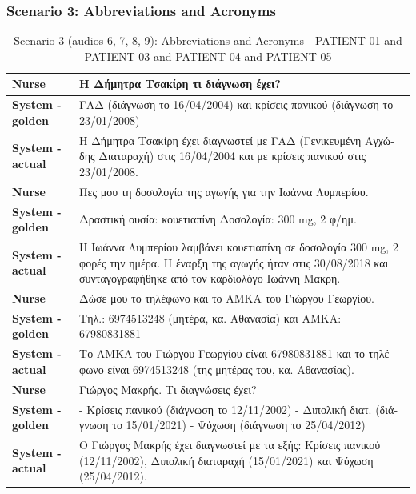 \subsubsection{Scenario 3: Abbreviations and Acronyms}
\begin{table}[H]
\centering
\renewcommand{\arraystretch}{1.5} 
\begin{tabular}{|>{\bfseries}l|p{11cm}|}
\hline
Nurse & \textgreek{Η Δήμητρα Τσακίρη τι διάγνωση έχει?} \\
\hline
System - golden & \textgreek{ΓΑΔ (διάγνωση το 16/04/2004) και κρίσεις πανικού (διάγνωση το 23/01/2008)} \\
\hline 
System - actual & \textgreek{Η Δήμητρα Τσακίρη έχει διαγνωστεί με ΓΑΔ (Γενικευμένη Αγχώδης Διαταραχή) στις 16/04/2004 και με κρίσεις πανικού στις 23/01/2008.} \\
\hline
Nurse & \textgreek{Πες μου τη δοσολογία της αγωγής για την Ιωάννα Λυμπερίου.} \\
\hline
System - golden & \textgreek{Δραστική ουσία: κουετιαπίνη
Δοσολογία: 300} mg, \textgreek{2 φ/ημ.} \\
\hline
System - actual & \textgreek{Η Ιωάννα Λυμπερίου λαμβάνει κουετιαπίνη σε δοσολογία 300} mg, \textgreek{2 φορές την ημέρα. Η έναρξη της αγωγής ήταν στις 30/08/2018 και συνταγογραφήθηκε από τον καρδιολόγο Ιωάννη Μακρή.} \\
\hline
Nurse & \textgreek{Δώσε μου το τηλέφωνο και το ΑΜΚΑ του Γιώργου Γεωργίου.} \\
\hline
System - golden & \textgreek{Τηλ.: 6974513248 (μητέρα, κα. Αθανασία) και ΑΜΚΑ: 67980831881} \\
\hline
System - actual & \textgreek{Το ΑΜΚΑ του Γιώργου Γεωργίου είναι 67980831881 και το τηλέφωνο είναι 6974513248 (της μητέρας του, κα. Αθανασίας).} \\
\hline
Nurse & \textgreek{Γιώργος Μακρής. Τι διαγνώσεις έχει?} \\
\hline
System - golden & \textgreek{- Κρίσεις πανικού (διάγνωση το 12/11/2002)
- Διπολική διατ. (διάγνωση το 15/01/2021)
- Ψύχωση (διάγνωση το 25/04/2012)} \\
\hline
System - actual & \textgreek{Ο Γιώργος Μακρής έχει διαγνωστεί με τα εξής: Κρίσεις πανικού (12/11/2002), Διπολική διαταραχή (15/01/2021) και Ψύχωση (25/04/2012).} \\
\hline
\end{tabular}
\caption{Scenario 3 (audios 6, 7, 8, 9): Abbreviations and Acronyms - PATIENT 01 and PATIENT 03 and PATIENT 04 and PATIENT 05}
\end{table}

